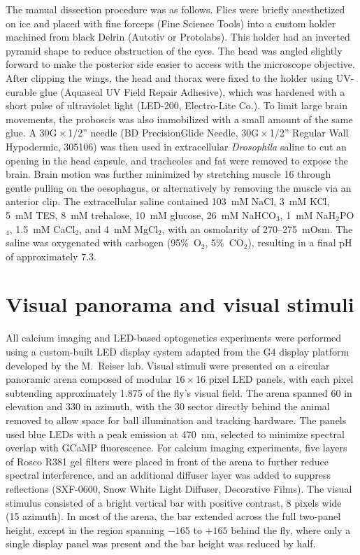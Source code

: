The manual dissection procedure was as follows. Flies were briefly anesthetized on ice and placed with fine forceps (Fine Science Tools) into a custom holder machined from black Delrin (Autotiv or Protolabs). This holder had an inverted pyramid shape to reduce obstruction of the eyes. The head was angled slightly forward to make the posterior side easier to access with the microscope objective. After clipping the wings, the head and thorax were fixed to the holder using UV-curable glue (Aquaseal UV Field Repair Adhesive), which was hardened with a short pulse of ultraviolet light (LED-200, Electro-Lite Co.). To limit large brain movements, the proboscis was also immobilized with a small amount of the same glue. A 30G\,$\times$\,1/2'' needle (BD PrecisionGlide Needle, 30G\,$\times$\,1/2'' Regular Wall Hypodermic, 305106) was then used in extracellular \textit{Drosophila} saline to cut an opening in the head capsule, and tracheoles and fat were removed to expose the brain. Brain motion was further minimized by stretching muscle 16 through gentle pulling on the oesophagus, or alternatively by removing the muscle via an anterior clip. The extracellular saline contained 103~mM NaCl, 3~mM KCl, 5~mM TES, 8~mM trehalose, 10~mM glucose, 26~mM NaHCO$_3$, 1~mM NaH$_2$PO$_4$, 1.5~mM CaCl$_2$, and 4~mM MgCl$_2$, with an osmolarity of 270--275~mOsm. The saline was oxygenated with carbogen (95\%~O$_2$, 5\%~CO$_2$), resulting in a final pH of approximately 7.3.

\section{Visual panorama and visual stimuli}

All calcium imaging and LED-based optogenetics experiments were performed using a custom-built LED display system adapted from the G4 display platform developed by the M.~Reiser lab. Visual stimuli were presented on a circular panoramic arena composed of modular 16\,$\times$\,16 pixel LED panels, with each pixel subtending approximately 1.875\textdegree{} of the fly's visual field. The arena spanned 60\textdegree{} in elevation and 330\textdegree{} in azimuth, with the 30\textdegree{} sector directly behind the animal removed to allow space for ball illumination and tracking hardware. The panels used blue LEDs with a peak emission at 470~nm, selected to minimize spectral overlap with GCaMP fluorescence. For calcium imaging experiments, five layers of Rosco R381 gel filters were placed in front of the arena to further reduce spectral interference, and an additional diffuser layer was added to suppress reflections (SXF-0600, Snow White Light Diffuser, Decorative Films). The visual stimulus consisted of a bright vertical bar with positive contrast, 8 pixels wide (15\textdegree{} azimuth). In most of the arena, the bar extended across the full two-panel height, except in the region spanning $-165$\textdegree{} to $+165$\textdegree{} behind the fly, where only a single display panel was present and the bar height was reduced by half.

